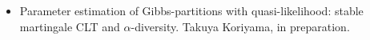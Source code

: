 \documentclass[10pt]{amsart}
\begin{document}
\begin{itemize}
  \item Parameter estimation of Gibbs-partitions with quasi-likelihood: stable martingale CLT and $\alpha$-diversity. 
  Takuya Koriyama, in preparation. 
\end{itemize}






\end{document}

